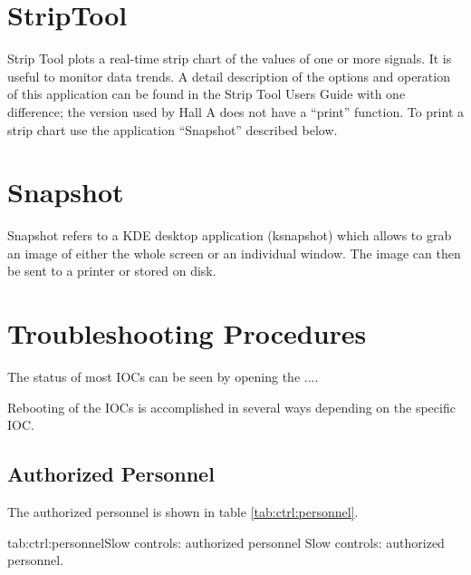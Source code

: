 {{\section{StripTool}
Strip Tool plots a real-time strip chart of the values of one or more signals.
It is useful to monitor data trends.
A detail description of the options and operation
of this application can be found in the Strip Tool Users
Guide
with one difference; the version used by Hall A does not have a ``print'' function.
To print a strip chart use the application ``Snapshot'' described below.

\section{Snapshot}
Snapshot refers to a KDE desktop application (ksnapshot) which allows to grab an image
of either the whole
screen or an individual window. The image can then be sent to a printer or stored on disk.

\section{Troubleshooting Procedures}
The status of most IOCs can be seen
by opening the ....

Rebooting of the IOCs is accomplished in several ways
depending on the specific IOC. 
} %

\infolevltone{\newpage}
\begin{safetyen}{10}{15}
\subsection{Authorized  Personnel} 
\end{safetyen}
The authorized personnel is shown in table \ref{tab:ctrl:personnel}.
\begin{namestab}{tab:ctrl:personnel}{Slow controls: authorized personnel}{%
      Slow controls: authorized personnel.}
  \KenLivingston{}
\end{namestab}


}

